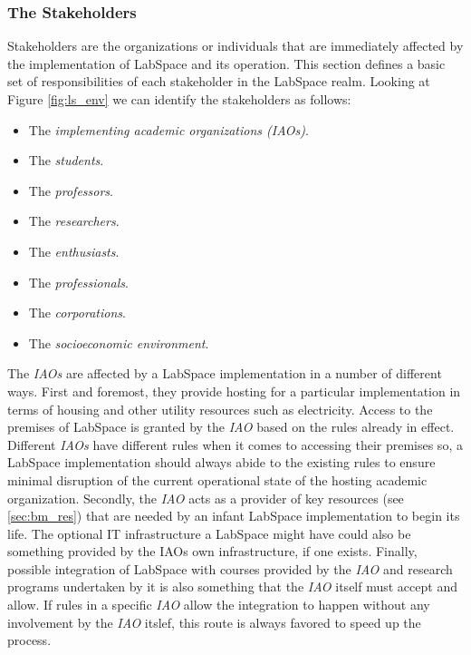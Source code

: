 \documentclass[a4paper, 11pt]{article}
\begin{document}
\subsubsection{The Stakeholders} \label{sec:bm_stakeholders}

Stakeholders are the organizations or individuals that are immediately affected by the implementation of LabSpace and its operation. This section defines a basic set of responsibilities of each stakeholder in the LabSpace realm. Looking at Figure \ref{fig:ls_env} we can identify the stakeholders as follows:

\begin{itemize}[noitemsep]
    \item The \textit{implementing academic organizations (IAOs)}.
    \item The \textit{students}.
    \item The \textit{professors}.
    \item The \textit{researchers}.
    \item The \textit{enthusiasts}.
    \item The \textit{professionals}.
    \item The \textit{corporations}.
    \item The \textit{socioeconomic environment}.
\end{itemize}

The \textit{IAOs} are affected by a LabSpace implementation in a number of different ways. First and foremost, they provide hosting for a particular implementation in terms of housing and other utility resources such as electricity. Access to the premises of LabSpace is granted by the \textit{IAO} based on the rules already in effect. Different \textit{IAOs} have different rules when it comes to accessing their premises so, a LabSpace implementation should always abide to the existing rules to ensure minimal disruption of the current operational state of the hosting academic organization. Secondly, the \textit{IAO} acts as a provider of key resources (see \ref{sec:bm_res}) that are needed by an infant LabSpace implementation to begin its life. The optional IT infrastructure a LabSpace might have could also be something provided by the IAOs own infrastructure, if one exists. Finally, possible integration of LabSpace with courses provided by the \textit{IAO} and research programs undertaken by it is also something that the \textit{IAO} itself must accept and allow. If rules in a specific \textit{IAO} allow the integration to happen without any involvement by the \textit{IAO} itslef, this route is always favored to speed up the process.
\end{document}
